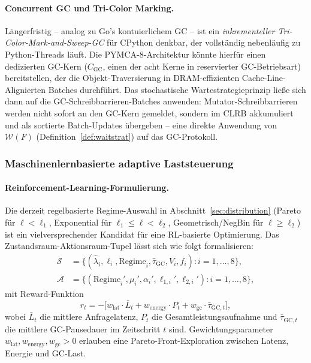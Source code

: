 ﻿\documentclass[a4paper,12pt]{scrreprt}
\theoremstyle{definition}
\begin{document}
	\paragraph{Concurrent GC und Tri-Color Marking.}
	Längerfristig -- analog zu Go's kontuierlichem GC -- ist ein
	\emph{inkrementeller Tri-Color-Mark-and-Sweep-GC} für CPython denkbar,
	der vollständig nebenläufig zu Python-Threads läuft. Die PYMCA-8-Architektur
	könnte hierfür einen dedizierten GC-Kern ($C_{\mathrm{GC}}$, einen der acht
	Kerne in reservierter GC-Betriebsart) bereitstellen, der die Objekt-Traversierung
	in DRAM-effizienten Cache-Line-Alignierten Batches durchführt. Das
	stochastische Wartestrategieprinzip ließe sich dann auf die
	GC-Schreibbarrieren-Batches anwenden: Mutator-Schreibbarrieren werden
	nicht sofort an den GC-Kern gemeldet, sondern im CLRB akkumuliert und
	als sortierte Batch-Updates übergeben -- eine direkte Anwendung von
	$\mathcal{W}(F)$ (Definition~\ref{def:waitstrat}) auf das GC-Protokoll.

	\subsubsection{Maschinenlernbasierte adaptive Laststeuerung}

	\paragraph{Reinforcement-Learning-Formulierung.}
	Die derzeit regelbasierte Regime-Auswahl in Abschnitt~\ref{sec:distribution}
	(Pareto für $\ell < \ell_1$, Exponential für $\ell_1 \le \ell < \ell_2$,
	Geometrisch/NegBin für $\ell \ge \ell_2$) ist ein vielversprechender Kandidat
	für eine RL-basierte Optimierung. Das Zustandsraum-Aktionsraum-Tupel lässt sich
	wie folgt formalisieren:
	\begin{align}
		\mathcal{S} &= \bigl\{ (\hat\lambda_i, \ell_i, \mathrm{Regime}_i,
		\hat\tau_{\mathrm{GC}}, V_i, f_i) : i = 1,\ldots,8 \bigr\}, \\
		\mathcal{A} &= \bigl\{ (\mathrm{Regime}_i', \mu_i', \alpha_i',
		\ell_{1,i}', \ell_{2,i}') : i = 1,\ldots,8 \bigr\},
	\end{align}
	mit Reward-Funktion
	\begin{equation}
		r_t = -\bigl[ w_{\mathrm{lat}} \cdot \bar{L}_t
		+ w_{\mathrm{energy}} \cdot P_t
		+ w_{\mathrm{gc}} \cdot \bar\tau_{\mathrm{GC},t} \bigr],
		\label{eq:rl_reward}
	\end{equation}
	wobei $\bar{L}_t$ die mittlere Anfragelatenz, $P_t$ die Gesamtleistungsaufnahme
	und $\bar\tau_{\mathrm{GC},t}$ die mittlere GC-Pausedauer im Zeitschritt $t$ sind.
	Gewichtungsparameter $w_{\mathrm{lat}}, w_{\mathrm{energy}}, w_{\mathrm{gc}} > 0$
	erlauben eine Pareto-Front-Exploration zwischen Latenz, Energie und GC-Last.
\end{document}
